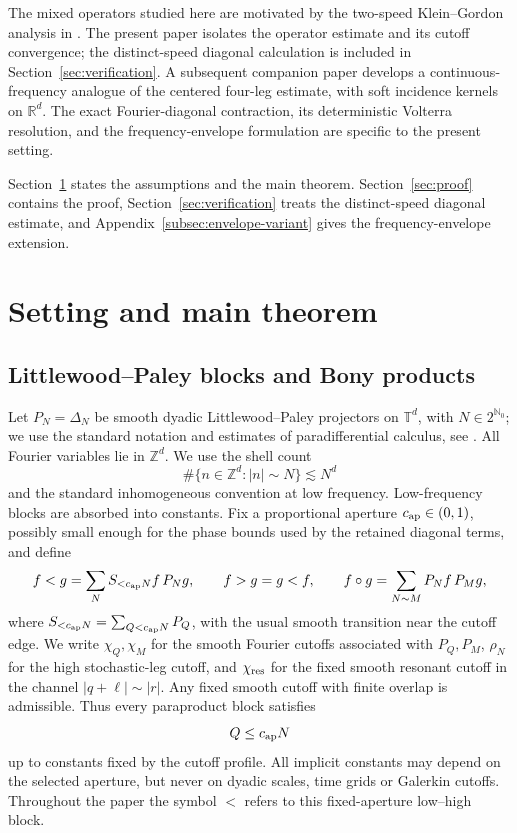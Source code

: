 \documentclass[11pt,reqno]{amsart}
\numberwithin{equation}{section}
\theoremstyle{plain}
\theoremstyle{definition}
\newcommand{\T}{\mathbb T}
\newcommand{\Z}{\mathbb Z}
\newcommand{\N}{\mathbb N}
\begin{document}
The mixed operators studied here are motivated by the two-speed
Klein--Gordon analysis in \cite{ZhaoColorPhase}.  The present paper isolates
the operator estimate and its cutoff convergence; the distinct-speed
diagonal calculation is included in Section~\ref{sec:verification}.
A subsequent companion paper \cite{ZhaoLocalized} develops a
continuous-frequency analogue of the centered four-leg estimate, with soft
incidence kernels on \(\mathbb R^d\).  The exact Fourier-diagonal contraction,
its deterministic Volterra resolution, and the frequency-envelope
formulation are specific to the present setting.

Section~\ref{sec:formulation} states the assumptions and the main theorem.
Section~\ref{sec:proof} contains the proof,
Section~\ref{sec:verification} treats the distinct-speed diagonal estimate,
and Appendix~\ref{subsec:envelope-variant} gives the frequency-envelope
extension.

\section{Setting and main theorem}\label{sec:formulation}

\subsection{Littlewood--Paley blocks and Bony products}\label{sec:setup}
Let \(P_N=\Delta_N\) be smooth dyadic Littlewood--Paley projectors on \(\T^d\), with \(N\in2^{\N_0}\); we use the standard notation and estimates of paradifferential calculus, see \cite{BCD}.  All Fourier variables lie in \(\Z^d\).  We use the shell count
\begin{equation}\label{eq:shell-count}
        \#\{n\in\Z^d: |n|\sim N\}\lesssim N^d
\end{equation}
and the standard inhomogeneous convention at low frequency.  Low-frequency blocks are absorbed into constants.  Fix a proportional aperture \(c_{\rm ap}\in(0,1)\), possibly small enough for the phase bounds used by the retained diagonal terms, and define
\begin{equation}\label{eq:bony}
        f<g=\sum_N S_{<c_{\rm ap}N}f\,P_Ng,
        \qquad
        f>g=g<f,
        \qquad
        f\circ g=\sum_{N\sim M}P_Nf\,P_Mg,
\end{equation}
where \(S_{<c_{\rm ap}N}=\sum_{Q<c_{\rm ap}N}P_Q\), with the usual smooth transition near the cutoff edge.  We write \(\chi_Q,\chi_M\) for the smooth Fourier cutoffs associated with \(P_Q,P_M\), \(\rho_N\) for the high stochastic-leg cutoff, and \(\chi_{\rm res}\) for the fixed smooth resonant cutoff in the channel \(|q+\ell|\sim |r|\).  Any fixed smooth cutoff with finite overlap is admissible.  Thus every paraproduct block satisfies
\begin{equation}\label{eq:aperture}
        Q\le c_{\rm ap}N
\end{equation}
up to constants fixed by the cutoff profile.  All implicit constants may depend on the selected aperture, but never on dyadic scales, time grids or Galerkin cutoffs.
Throughout the paper the symbol \(<\) refers to this fixed-aperture
low--high block.
\end{document}
